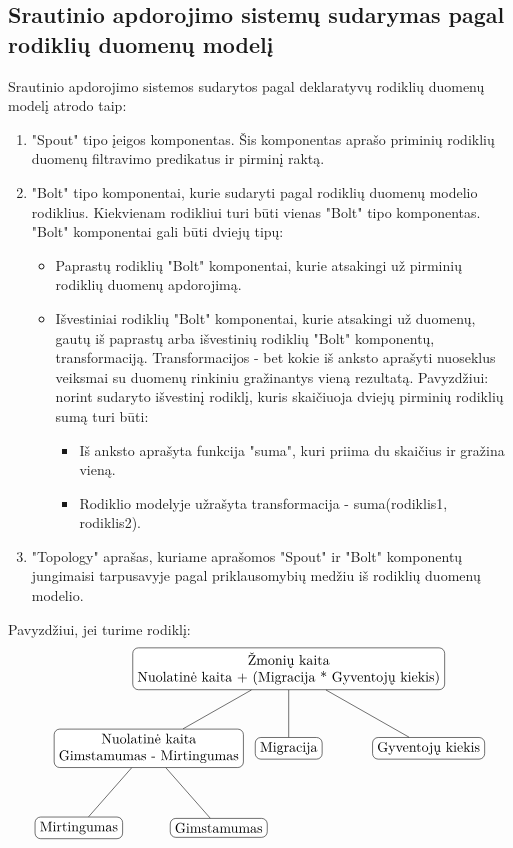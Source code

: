 \documentclass{VUMIFPSbakalaurinis}
\begin{document}
\subsection{Srautinio apdorojimo sistemų sudarymas pagal rodiklių duomenų modelį}
Srautinio apdorojimo sistemos sudarytos pagal deklaratyvų rodiklių duomenų modelį atrodo taip:
\begin{enumerate}
    \item "Spout" tipo įeigos komponentas. Šis komponentas aprašo priminių rodiklių duomenų filtravimo predikatus ir pirminį raktą. 
    \item "Bolt" tipo komponentai, kurie sudaryti pagal rodiklių duomenų modelio rodiklius. Kiekvienam rodikliui turi būti vienas "Bolt" tipo komponentas. "Bolt" komponentai gali būti dviejų tipų:
    \begin{itemize}
        \item Paprastų rodiklių "Bolt" komponentai, kurie atsakingi už pirminių rodiklių duomenų apdorojimą.
        \item Išvestiniai rodiklių "Bolt" komponentai, kurie atsakingi už duomenų, gautų iš paprastų arba išvestinių rodiklių "Bolt" komponentų, transformaciją. Transformacijos - bet kokie iš anksto aprašyti nuoseklus veiksmai su duomenų rinkiniu gražinantys vieną rezultatą. Pavyzdžiui: norint sudaryto išvestinį rodiklį, kuris skaičiuoja dviejų pirminių rodiklių sumą turi būti:
        \begin{itemize}
            \item Iš anksto aprašyta funkcija "suma", kuri priima du skaičius ir gražina vieną.
            \item Rodiklio modelyje užrašyta transformacija - suma(rodiklis1, rodiklis2).
        \end{itemize} 
    \end{itemize}
    \item "Topology" aprašas, kuriame aprašomos "Spout" ir "Bolt" komponentų jungimaisi tarpusavyje pagal priklausomybių medžiu iš rodiklių duomenų modelio.
\end{enumerate}
Pavyzdžiui, jei turime rodiklį:     
\[
    \begin{tikzpicture}[sibling distance=10em,
        level distance=2cm,
        every node/.style = {shape=rectangle, rounded corners,	
                             draw, align=center,	
                             top color=white, bottom color=white}]	
        \node{Žmonių kaita\\Nuolatinė kaita + (Migracija * Gyventojų kiekis)}
                child { node {Nuolatinė kaita\\Gimstamumas - Mirtingumas} 
                        child {node {Mirtingumas}}
                        child {node {Gimstamumas}} }	
                child { node {Migracija} } 	
                child { node {Gyventojų kiekis} }; 	
    \end{tikzpicture} 	
\]
\end{document}
